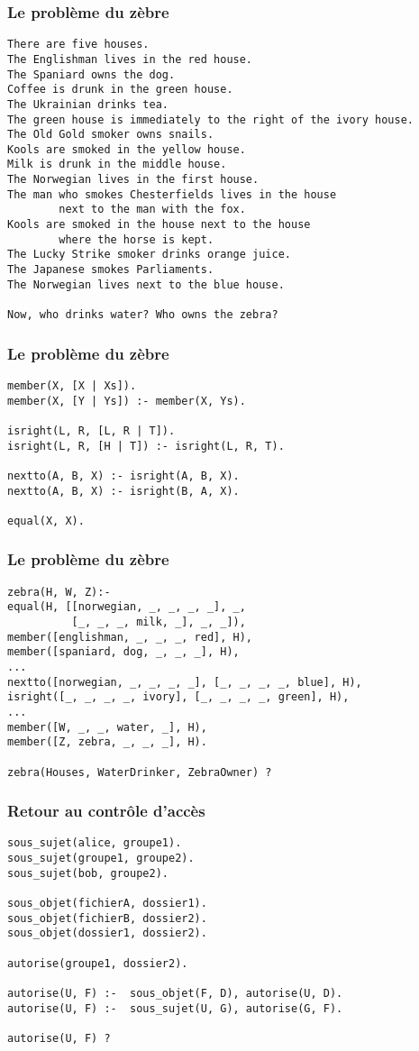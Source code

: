 \documentclass[aspectratio=43]{beamer}
\begin{document}
\begin{frame}[fragile]
  \frametitle{Le problème du zèbre}
\begin{Verbatim}[fontsize=\footnotesize]
There are five houses.
The Englishman lives in the red house.
The Spaniard owns the dog.
Coffee is drunk in the green house.
The Ukrainian drinks tea.
The green house is immediately to the right of the ivory house.
The Old Gold smoker owns snails.
Kools are smoked in the yellow house.
Milk is drunk in the middle house.
The Norwegian lives in the first house.
The man who smokes Chesterfields lives in the house
        next to the man with the fox.
Kools are smoked in the house next to the house
        where the horse is kept.
The Lucky Strike smoker drinks orange juice.
The Japanese smokes Parliaments.
The Norwegian lives next to the blue house.

Now, who drinks water? Who owns the zebra?
\end{Verbatim}
\end{frame}


\begin{frame}[fragile]
  \frametitle{Le problème du zèbre}
\begin{verbatim}
member(X, [X | Xs]).
member(X, [Y | Ys]) :- member(X, Ys).

isright(L, R, [L, R | T]).
isright(L, R, [H | T]) :- isright(L, R, T).

nextto(A, B, X) :- isright(A, B, X).
nextto(A, B, X) :- isright(B, A, X).

equal(X, X).
\end{verbatim}
\end{frame}

\begin{frame}[fragile]
  \frametitle{Le problème du zèbre}
\begin{verbatim}
zebra(H, W, Z):-
equal(H, [[norwegian, _, _, _, _], _,
          [_, _, _, milk, _], _, _]),
member([englishman, _, _, _, red], H),
member([spaniard, dog, _, _, _], H),
...
nextto([norwegian, _, _, _, _], [_, _, _, _, blue], H),
isright([_, _, _, _, ivory], [_, _, _, _, green], H),
...
member([W, _, _, water, _], H),
member([Z, zebra, _, _, _], H).

zebra(Houses, WaterDrinker, ZebraOwner) ?
\end{verbatim}
\end{frame}


\begin{frame}[fragile]
  \frametitle{Retour au contrôle d'accès}
\begin{verbatim}
sous_sujet(alice, groupe1).
sous_sujet(groupe1, groupe2).
sous_sujet(bob, groupe2).

sous_objet(fichierA, dossier1).
sous_objet(fichierB, dossier2).
sous_objet(dossier1, dossier2).

autorise(groupe1, dossier2).

autorise(U, F) :-  sous_objet(F, D), autorise(U, D).
autorise(U, F) :-  sous_sujet(U, G), autorise(G, F).

autorise(U, F) ?
\end{verbatim}
\end{frame}
\end{document}
